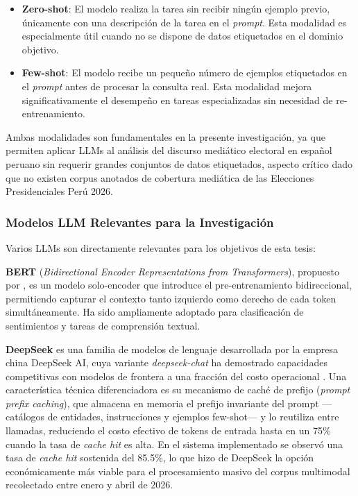 \begin{itemize}
    \item \textbf{Zero-shot}: El modelo realiza la tarea sin recibir ningún ejemplo previo, únicamente con una descripción de la tarea en el \textit{prompt}. Esta modalidad es especialmente útil cuando no se dispone de datos etiquetados en el dominio objetivo.
    \item \textbf{Few-shot}: El modelo recibe un pequeño número de ejemplos etiquetados en el \textit{prompt} antes de procesar la consulta real. Esta modalidad mejora significativamente el desempeño en tareas especializadas sin necesidad de re-entrenamiento.
\end{itemize}

Ambas modalidades son fundamentales en la presente investigación, ya que permiten aplicar LLMs al análisis del discurso mediático electoral en español peruano sin requerir grandes conjuntos de datos etiquetados, aspecto crítico dado que no existen corpus anotados de cobertura mediática de las Elecciones Presidenciales Perú 2026.

\subsubsection{Modelos LLM Relevantes para la Investigación}

Varios LLMs son directamente relevantes para los objetivos de esta tesis:

\textbf{BERT} (\textit{Bidirectional Encoder Representations from Transformers}), propuesto por \cite{tec_devlin2018bert}, es un modelo solo-encoder que introduce el pre-entrenamiento bidireccional, permitiendo capturar el contexto tanto izquierdo como derecho de cada token simultáneamente. Ha sido ampliamente adoptado para clasificación de sentimientos y tareas de comprensión textual.

\textbf{DeepSeek} es una familia de modelos de lenguaje desarrollada por la empresa china DeepSeek AI, cuya variante \textit{deepseek-chat} ha demostrado capacidades competitivas con modelos de frontera a una fracción del costo operacional \parencite{tec_deepseek2024}. Una característica técnica diferenciadora es su mecanismo de caché de prefijo (\textit{prompt prefix caching}), que almacena en memoria el prefijo invariante del prompt —catálogos de entidades, instrucciones y ejemplos few-shot— y lo reutiliza entre llamadas, reduciendo el costo efectivo de tokens de entrada hasta en un 75\% cuando la tasa de \textit{cache hit} es alta. En el sistema implementado se observó una tasa de \textit{cache hit} sostenida del 85.5\%, lo que hizo de DeepSeek la opción económicamente más viable para el procesamiento masivo del corpus multimodal recolectado entre enero y abril de 2026.

